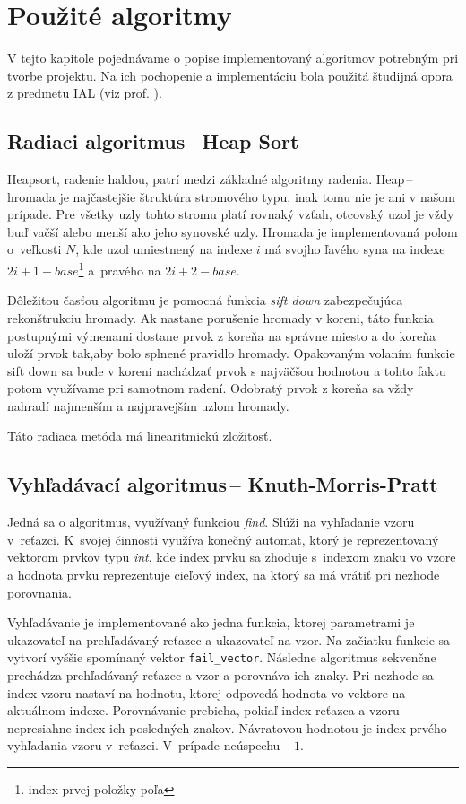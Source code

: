 \documentclass[11pt,a4paper]{article}
\begin{document}
	
	
	
	\section{Použité algoritmy}
	\label{algoritmy}
	
	V tejto kapitole pojednávame o popise implementovaný algoritmov potrebným pri tvorbe projektu. Na ich pochopenie a implementáciu bola použitá študijná opora z predmetu IAL (viz prof. \cite{opora}).
	
	\subsection{Radiaci algoritmus\,--\,Heap Sort}
	
	Heapsort, radenie haldou, patrí medzi základné algoritmy radenia. Heap\,--\,hromada je
	najčastejšie štruktúra stromového typu, inak tomu nie je ani v našom prípade.
	Pre všetky uzly tohto stromu platí rovnaký vzťah, otcovský uzol je vždy buď
	vačší alebo menší ako jeho synovské uzly. Hromada je implementovaná polom o~veľkosti $N$,
	kde uzol umiestnený na indexe $i$ má svojho ľavého syna na indexe
	$2i+1-base$\footnote{index prvej položky poľa} a~pravého na $2i+2-base$.
	
	Dôležitou časťou algoritmu je pomocná funkcia \textit{sift down} zabezpečujúca rekonštrukciu hromady. Ak nastane porušenie hromady v koreni, táto funkcia postupnými výmenami dostane prvok z koreňa na správne miesto a do koreňa uloží prvok tak,aby bolo splnené pravidlo hromady. Opakovaným volaním funkcie sift down sa bude v koreni nachádzať prvok s najväčšou hodnotou a tohto faktu potom využívame pri samotnom radení. Odobratý prvok z koreňa sa vždy nahradí najmenším a najpravejším uzlom hromady.
	
	Táto radiaca metóda má linearitmickú zložitosť.
	
	\subsection{Vyhľadávací algoritmus\,-- Knuth-Morris-Pratt}
	
	Jedná sa o algoritmus, využívaný funkciou \textit{find}. Slúži na vyhľadanie vzoru v~reťazci. K~svojej činnosti využíva konečný automat, ktorý je reprezentovaný vektorom prvkov typu \textit{int}, kde index prvku sa zhoduje s~indexom znaku vo vzore a hodnota prvku reprezentuje cieľový index, na ktorý sa má vrátiť pri nezhode porovnania.
	
	Vyhľadávanie je implementované ako jedna funkcia, ktorej parametrami je ukazovateľ na prehľadávaný reťazec a ukazovateľ na vzor. Na začiatku funkcie sa vytvorí vyššie spomínaný vektor \texttt{fail\_vector}. Následne algoritmus sekvenčne prechádza prehľadávaný reťazec a vzor a porovnáva ich znaky. Pri nezhode sa index vzoru nastaví na hodnotu, ktorej odpovedá hodnota vo vektore na aktuálnom indexe. Porovnávanie prebieha, pokiaľ index reťazca a vzoru nepresiahne	index ich posledných znakov. Návratovou hodnotou je index prvého vyhľadania vzoru v~reťazci. V~prípade neúspechu $-1$.
	
\end{document}
